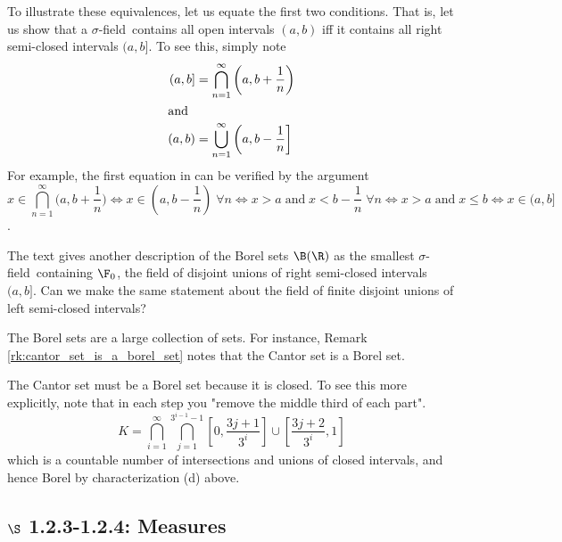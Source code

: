 \documentclass{article} %
\newif\ifActive
\renewcommand{\sf}{$\sigma$-field}
\begin{document}
\ifActive 
\textbf{Workshop Exercise}: Justify that (a) and (b) are equivalent. 
\else 
To illustrate these equivalences, let us equate the first two conditions. That is, let us show that a \sf\ contains all open intervals $(a,b)$ iff it contains all right semi-closed intervals $(a,b]$.  To see this, simply note
\begin{subequations}
\begin{align}
(a,b] &= \bigcap_{n=1}^\infty \bigg(a, b+\frac{1}{n}\bigg) \\
	\intertext{and}
(a,b) &= \bigcup_{n=1}^\infty \bigg(a, b-\frac{1}{n}\bigg] 
\end{align}
\label{eqn:open_intervals_as_rsc_intervals_and_vice_versa}
\end{subequations}
{\tiny For example, the first equation in  can be verified by the argument 
\[x \in  \bigcap_{n=1}^\infty \bigg(a, b+\frac{1}{n}\bigg) \iff x \in (a,b-\frac{1}{n}) \; \forall n \iff x>a \; \text{and} \; x < b -\frac{1}{n} \; \forall n \iff x >a \; \text{and} \; x \leq b \iff x \in (a,b] \]
.}

\fi 




\begin{question}
The text gives another description of the Borel sets $\B(\R)$ as the smallest \sf\ containing $\F_0$, the field of disjoint unions of right semi-closed intervals $(a,b]$.  Can we make the same statement about the field of finite disjoint unions of left semi-closed intervals?
\end{question}

The Borel sets are a large collection of sets.  For instance, Remark \ref{rk:cantor_set_is_a_borel_set} notes that the Cantor set is a Borel set. 

\begin{remark}{}
The Cantor set must be a Borel set because it is closed.  To see this more explicitly, note that in each step you "remove the middle third of each part".  
\[K = \bigcap_{i=1}^\infty\bigcap_{j=1}^{3^{i-1}-1}\left[0,\frac{3j+1}{3^i}\right]\cup \left[\frac{3j+2}{3^i}, 1\right] \]
which is a countable number of intersections and unions of closed intervals, and hence Borel by characterization (d) above. 
\label{rk:cantor_set_is_a_borel_set}
\end{remark}

\subsection{$\S$ 1.2.3-1.2.4: Measures}
\end{document}
